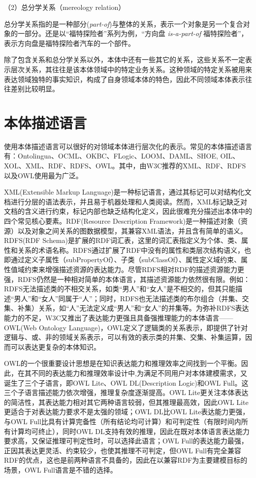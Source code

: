（2）总分学关系（mereology relation）

总分学关系指的是一种部分(\textit{part-of})与整体的关系，表示一个对象是另一个复合对象的一部分。还是以“福特探险者”系列为例，“方向盘 \textit{is-a-part-of} 福特探险者”，表示方向盘是福特探险者汽车的一个部件。

除了包含关系和总分学关系以外，本体中还有一些其它的关系，这些关系不一定表示层次关系，其往往是该本体领域中的特定业务关系。这种领域的特定关系被用来表达领域独特的事实知识，构成了自身领域本体的特色，因此不同领域本体表示往往差别比较明显。

\section{本体描述语言}
使用本体描述语言可以很好的对领域本体进行层次化的表示。常见的本体描述语言有：Ontolingua、OCML、OKBC、FLogic、LOOM、DAML、SHOE, OIL、XOL、XML、RDF、RDFS、OWL\cite{Corcho}。其中，由W3C推荐的XML、RDF、RDFS以及OWL使用最为广泛。

XML(Extensible Markup Language)\cite{xml}是一种标记语言，通过其标记可以对结构化文档进行分层的语法表示，并且易于机器处理和人类阅读。然而，XML标记缺乏对文档的含义进行约束，标记内部也缺乏结构化定义，因此很难充分描述出本体中的四个常见核心要素。RDF(Resource Description Framework)\cite{rdf}是一种描述对象（资源）以及对象之间关系的图数据模型，其兼容XML语法，并且含有简单的语义。RDFS(RDF Schema)\cite{rdfs}是扩展的RDF词汇表，这里的词汇表指定义为个体、类、属性和关系的术语名称。RDFS通过扩展了RDF中没有的属性和类层次结构语义，也即通过定义子属性（subPropertyOf）、子类（subClassOf）、属性定义域约束、属性值域约束来增强描述资源的表达能力。尽管RDFS相对RDF的描述资源能力更强，RDFS仍然是一种相对简单的本体语言，其描述资源能力依然很有限\cite{gao}。例如：RDFS无法描述类的不相交关系，如类“男人”和“女人”是不相交的，但其只能描述“男人”和“女人”同属于“人”；同时，RDFS也无法描述类的布尔组合（并集、交集、补集）关系，如“人”无法定义成“男人”和“女人”的并集等。为弥补RDFS表达能力的不足，W3C又推出了表达能力更强且具备强推理能力的本体语言——OWL(Web Ontology Language)\cite{owl}，OWL定义了逻辑类的关系表示，即提供了针对逻辑与、或、非的领域关系表示，可以有效的表示类的并集、交集、补集运算，因而可以表达更复杂的本体知识。

OWL的一个很重要设计思想是在知识表达能力和推理效率之间找到一个平衡。因此，在其不同的表达能力和推理效率设计中,为满足不同用户对本体建模需求，又诞生了三个子语言，即OWL Lite、OWL DL(Description Logic)和OWL Full。这三个子语言描述能力依次增强，推理复杂度逐渐提高。OWL Lite更关注本体表达的简洁性，其表达能力相对其它两种语言较弱，但其推理最高效，因此OWL Lite更适合于对表达能力要求不是太强的领域；OWL DL比OWL Lite表达能力更强，与OWL Full比具有计算完备性（所有结论均可计算）和可判定性（有限时间内所有计算均可终止），同时OWL DL支持有效的推理，因此在既对本体语言表达能力要求高，又保证推理可判定性时，可以选择此语言；OWL Full的表达能力最强，正因其表达更灵活、约束较少，也使其推理不可判定，但OWL Full有完全兼容RDF的优点，这也是前两种语言不具备的，因此在以兼容RDF为主要建模目标的场景，OWL Full语言是不错的选择。

